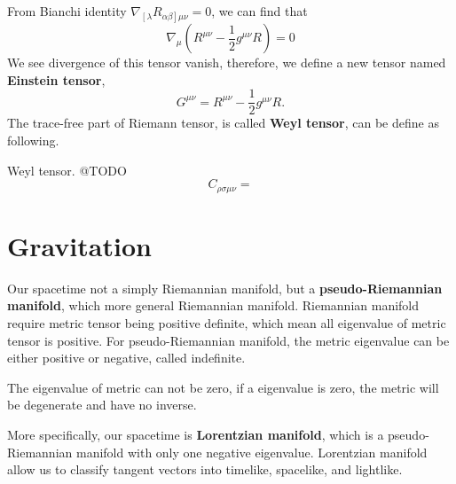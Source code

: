 \documentclass[12pt]{article}
\theoremstyle{mystyle}{\newtheorem{definition}{Definition}[section]}
\theoremstyle{mystyle}{\newtheorem{theorem}[definition]{Theorem}}
\theoremstyle{mystyle}{\newtheorem*{remark}{Remark}}
\theoremstyle{mystyle}{\newtheorem*{example}{Example}}
\theoremstyle{mystyle}{\newtheorem*{examples}{Examples}}
\theoremstyle{cstyle}{\newtheorem*{cthm}{}}
\begin{document}
From Bianchi identity \(\nabla_{\left[ \lambda \right.} R_{\left.\alpha\beta \right] \mu\nu} = 0\), 
we can find that \[\nabla_{\mu}(R^{\mu\nu}-\frac{1}{2}g^{\mu\nu}R) = 0\]
We see divergence of this tensor vanish, therefore, we define a new tensor named \textbf{Einstein tensor},
\[G^{\mu\nu}=R^{\mu\nu}-\frac{1}{2}g^{\mu\nu}R. \]
The trace-free part of Riemann tensor, is called \textbf{Weyl tensor}, can be define as following.
\begin{definition}
  Weyl tensor. @TODO
  \[C_{\rho\sigma\mu\nu} = \]
\end{definition}


\section{Gravitation}

Our spacetime not a simply Riemannian manifold, but a \textbf{pseudo-Riemannian manifold}, which more general Riemannian manifold.
Riemannian manifold require metric tensor being positive definite, which mean all eigenvalue of metric tensor is positive.
For pseudo-Riemannian manifold, the metric eigenvalue can be either positive or negative, called indefinite.
\begin{remark}
  The eigenvalue of metric can not be zero, if a eigenvalue is zero, the metric will be degenerate and have no inverse.
\end{remark}

More specifically, our spacetime is \textbf{Lorentzian manifold}, which is a pseudo-Riemannian manifold with only one negative eigenvalue.
Lorentzian manifold allow us to classify tangent vectors into timelike, spacelike, and lightlike.
\end{document}
